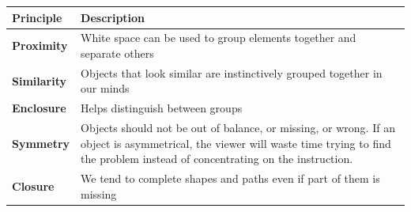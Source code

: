 \documentclass[]{book}
\theoremstyle{definition}
\theoremstyle{definition}
\theoremstyle{definition}
\theoremstyle{remark}
\begin{document}
\begin{longtable}[]{@{}ll@{}}
\toprule
\begin{minipage}[b]{0.16\columnwidth}\raggedright\strut
\textbf{Principle}\strut
\end{minipage} & \begin{minipage}[b]{0.78\columnwidth}\raggedright\strut
\textbf{Description}\strut
\end{minipage}\tabularnewline
\midrule
\endhead
\begin{minipage}[t]{0.16\columnwidth}\raggedright\strut
\textbf{Proximity}\strut
\end{minipage} & \begin{minipage}[t]{0.78\columnwidth}\raggedright\strut
White space can be used to group elements together and separate
others\strut
\end{minipage}\tabularnewline
\begin{minipage}[t]{0.16\columnwidth}\raggedright\strut
\textbf{Similarity}\strut
\end{minipage} & \begin{minipage}[t]{0.78\columnwidth}\raggedright\strut
Objects that look similar are instinctively grouped together in our
minds\strut
\end{minipage}\tabularnewline
\begin{minipage}[t]{0.16\columnwidth}\raggedright\strut
\textbf{Enclosure}\strut
\end{minipage} & \begin{minipage}[t]{0.78\columnwidth}\raggedright\strut
Helps distinguish between groups\strut
\end{minipage}\tabularnewline
\begin{minipage}[t]{0.16\columnwidth}\raggedright\strut
\textbf{Symmetry}\strut
\end{minipage} & \begin{minipage}[t]{0.78\columnwidth}\raggedright\strut
Objects should not be out of balance, or missing, or wrong. If an object
is asymmetrical, the viewer will waste time trying to find the problem
instead of concentrating on the instruction.\strut
\end{minipage}\tabularnewline
\begin{minipage}[t]{0.16\columnwidth}\raggedright\strut
\textbf{Closure}\strut
\end{minipage} & \begin{minipage}[t]{0.78\columnwidth}\raggedright\strut
We tend to complete shapes and paths even if part of them is
missing\strut
\end{minipage}\tabularnewline

\end{longtable}
\end{document}
